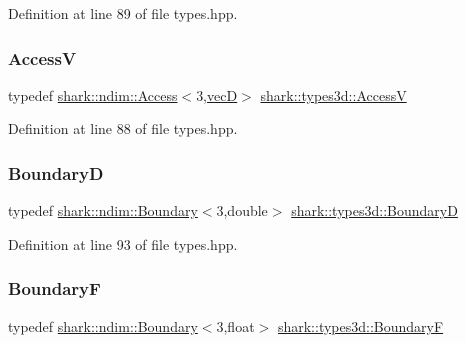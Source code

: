 Definition at line 89 of file types.\+hpp.

\hypertarget{namespaceshark_1_1types3d_add4579ebeb71c8363baba06d4ea576f3}{}\label{namespaceshark_1_1types3d_add4579ebeb71c8363baba06d4ea576f3} 
\subsubsection{\texorpdfstring{AccessV}{AccessV}}
{\footnotesize\ttfamily typedef \hyperlink{classshark_1_1ndim_1_1_access}{shark\+::ndim\+::\+Access}$<$3,\hyperlink{namespaceshark_1_1types3d_a2ad4ea08e8e6d62a99ffef91988c717c}{vecD}$>$ \hyperlink{namespaceshark_1_1types3d_add4579ebeb71c8363baba06d4ea576f3}{shark\+::types3d\+::\+AccessV}}



Definition at line 88 of file types.\+hpp.

\hypertarget{namespaceshark_1_1types3d_afe32c5ed11d5f0a5e20fef2f7f9489d2}{}\label{namespaceshark_1_1types3d_afe32c5ed11d5f0a5e20fef2f7f9489d2} 
\subsubsection{\texorpdfstring{BoundaryD}{BoundaryD}}
{\footnotesize\ttfamily typedef \hyperlink{classshark_1_1ndim_1_1_boundary}{shark\+::ndim\+::\+Boundary}$<$3,double$>$ \hyperlink{namespaceshark_1_1types3d_afe32c5ed11d5f0a5e20fef2f7f9489d2}{shark\+::types3d\+::\+BoundaryD}}



Definition at line 93 of file types.\+hpp.

\hypertarget{namespaceshark_1_1types3d_a6bcca8dc908860524a26a4a90c5449bb}{}\label{namespaceshark_1_1types3d_a6bcca8dc908860524a26a4a90c5449bb} 
\subsubsection{\texorpdfstring{BoundaryF}{BoundaryF}}
{\footnotesize\ttfamily typedef \hyperlink{classshark_1_1ndim_1_1_boundary}{shark\+::ndim\+::\+Boundary}$<$3,float$>$ \hyperlink{namespaceshark_1_1types3d_a6bcca8dc908860524a26a4a90c5449bb}{shark\+::types3d\+::\+BoundaryF}}



